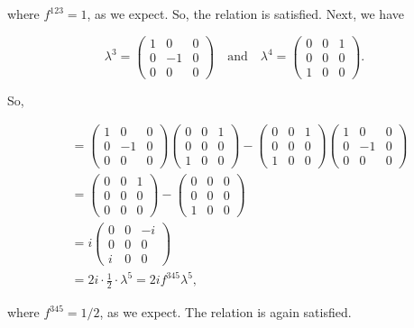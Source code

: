 where $f^{123}=1$, as we expect. So, the relation is satisfied. Next, we have

\begin{equation}
  \lambda^3 = \begin{pmatrix}1 & 0 & 0 \\ 0 & -1 & 0 \\ 0 & 0 & 0\end{pmatrix} \quad\mathrm{and}\quad \lambda^4 = \begin{pmatrix}0 & 0 & 1 \\ 0 & 0 & 0 \\ 1 & 0 & 0\end{pmatrix}.
\end{equation}

So,

\begin{align}
  [\lambda^3, \lambda^4] &= \begin{pmatrix}1 & 0 & 0 \\ 0 & -1 & 0 \\ 0 & 0 & 0\end{pmatrix}\begin{pmatrix}0 & 0 & 1 \\ 0 & 0 & 0 \\ 1 & 0 & 0\end{pmatrix} - \begin{pmatrix}0 & 0 & 1 \\ 0 & 0 & 0 \\ 1 & 0 & 0\end{pmatrix}\begin{pmatrix}1 & 0 & 0 \\ 0 & -1 & 0 \\ 0 & 0 & 0\end{pmatrix} \\
                         &= \begin{pmatrix}0 & 0 & 1 \\ 0 & 0 & 0 \\ 0 & 0 & 0\end{pmatrix} - \begin{pmatrix}0 & 0 & 0 \\ 0 & 0 & 0 \\ 1 & 0 & 0\end{pmatrix} \\
                         &= i \begin{pmatrix}0 & 0 & -i \\ 0 & 0 & 0 \\ i & 0 & 0\end{pmatrix} \\
                         &= 2i \cdot \frac{1}{2} \cdot \lambda^5 = 2i f^{345} \lambda^5,
\end{align}

where $f^{345} = 1/2$, as we expect. The relation is again satisfied.



